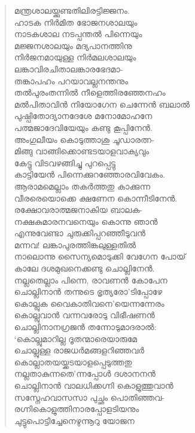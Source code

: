 \begin{verse}
മന്ത്രശാലയ്ക്കുണ്ടതിലിരട്ടിജ്ജനം.\\
ഹാടക നിര്‍മിത ഭോജനശാലയും\\
നാടകശാല നടപ്പന്തല്‍ പിന്നെയും\\
മജ്ജനശാലയും മദ്യപാനത്തിനു\\
നിര്‍ജനമായുള്ള നിര്‍മലശാലയും\\
ലങ്കാവിരചിതാലങ്കാരഭേദമാ-\\
തങ്കാപഹം പറയാവല്ലനന്തനും\\
തല്‍പുരംതന്നില്‍ നീളെത്തിരഞ്ഞേനഹം\\
മല്‍പിതാവിന്‍ നിയോഗേന ചെന്നേന്‍ ബലാല്‍\\
പുഷ്പിതോദ്യാനദേശേ മനോമോഹനേ\\
പത്മജാദേവിയേയും കണ്ടു കൂപ്പിനേന്‍.\\
അംഗുലീയം കൊടുത്താശു ചൂഡാരത്ന-\\
മിങ്ങു വാങ്ങിക്കൊണ്ടടയാളവാക്യവും\\
കേട്ടു വിടവഴങ്ങിച്ചു പുറപ്പെട്ടു\\
കാട്ടിയേന്‍ പിന്നെക്കുറഞ്ഞോരവിവേകം.\\
ആരാമമെല്ലാം തകര്‍ത്തതു കാക്കുന്ന\\
വീരരെയൊക്കെ ക്ഷണേന കൊന്നീടിനേന്‍.\\
രക്ഷോവരാത്മജനാകിയ ബാലക-\\
നക്ഷകുമാരനവനെയും കൊന്നു ഞാന്‍\\
എന്നുവേണ്ടാ ചുരുക്കിപ്പറഞ്ഞീടുവന്‍\\
മന്നവ! ലങ്കാപുരത്തിങ്കലുള്ളതില്‍\\
നാലൊന്നു സൈന്യമൊടുക്കി വേഗേന പോയ്\\
കാലേ ദശമുഖനെക്കണ്ടു ചൊല്ലിനേന്‍.\\
നല്ലതെല്ലാം പിന്നെ, രാവണന്‍ കോപേന\\
ചൊല്ലിനാന്‍ തന്നുടെ ഭൃത്യരോ’ടിപ്പോഴേ\\
കൊല്ലുക വൈകാതിവനെ’യെന്നന്നേരം\\
കൊല്ലുവാന്‍ വന്നവരോടു വിഭീഷണന്‍\\
ചൊല്ലിനാനഗ്രജന്‍ തന്നോടുമാദരാല്‍:\\
‘കൊല്ലുമാറില്ല ദൂതന്മാരെയാരുമേ\\
ചൊല്ലുള്ള രാജധര്‍മങ്ങളറിഞ്ഞവര്‍\\
കൊല്ലാതയയ്ക്കടയാളപ്പെടുത്തതു\\
നല്ലതാകുന്നതെ’ന്നപ്പോള്‍ ദശാനനന്‍\\
ചൊല്ലിനാന്‍ വാലധിക്കഗ്നി കൊളുത്തുവാന്‍\\
സസ്നേഹവാസസാ പുച്ഛം പൊതിഞ്ഞവ-\\
രഗ്നികൊളുത്തിനാരപ്പോളടിയനും\\
ചുട്ടുപൊട്ടിച്ചേനെഴുന്നൂറു യോജന\\

\end{verse}
